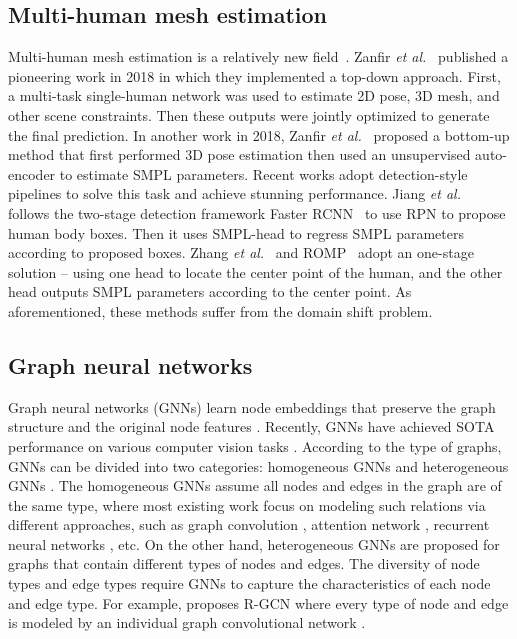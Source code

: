 \documentclass[runningheads]{llncs}
\begin{document}
\subsection{Multi-human mesh estimation}
Multi-human mesh estimation is a relatively new field~\cite{zanfir2018monocular,zanfir2018deep,jiang2020coherent,zhang2021body,sun2021monocular}. Zanfir {\it et al.}~\cite{zanfir2018monocular} published a pioneering work in 2018 in which they implemented a top-down approach. First, a multi-task single-human network was used to estimate 2D pose, 3D mesh, and other scene constraints. Then these outputs were jointly optimized to generate the final prediction.
In another work in 2018, Zanfir {\it et al.}~\cite{zanfir2018deep} proposed a bottom-up method that first performed 3D pose estimation then used an unsupervised auto-encoder to estimate SMPL parameters. 
Recent works adopt detection-style pipelines to solve this task and achieve stunning performance. 
Jiang {\it et al.}~\cite{jiang2020coherent} follows the two-stage detection framework Faster RCNN~\cite{ren2015faster} to use RPN to propose human body boxes. Then it uses SMPL-head to regress SMPL parameters according to proposed boxes. Zhang {\it et al.}~\cite{zhang2021body} and ROMP~\cite{sun2021monocular} adopt an one-stage solution -- using one head to locate the center point of the human, and the other head outputs SMPL parameters according to the center point. As aforementioned, these methods suffer from the domain shift problem.


\subsection{Graph neural networks}
Graph neural networks (GNNs) learn node embeddings that preserve the graph structure and the original node features \cite{kipf2016semi}. 
Recently, GNNs have achieved SOTA performance on various computer vision tasks \cite{li2019actional,choi2020pose2mesh,yang2020distilling,huang2023fsd}. According to the type of graphs, GNNs can be divided into two categories: homogeneous GNNs \cite{kipf2016semi,velivckovic2017graph,hamilton2017inductive} and heterogeneous GNNs \cite{schlichtkrull2018modeling,wang2019heterogeneous}. The homogeneous GNNs assume all nodes and edges in the graph are of the same type, where most existing work focus on modeling such relations via different approaches, such as graph convolution \cite{kipf2016semi}, attention network \cite{velivckovic2017graph}, recurrent neural networks \cite{hamilton2017inductive}, etc.
On the other hand, heterogeneous GNNs are proposed for graphs that contain different types of nodes and edges. The diversity of node types and edge types require GNNs to capture the characteristics of each node and edge type. For example, \cite{schlichtkrull2018modeling} proposes R-GCN where every type of node and edge is modeled by an individual graph convolutional network \cite{kipf2016semi}.
\end{document}
